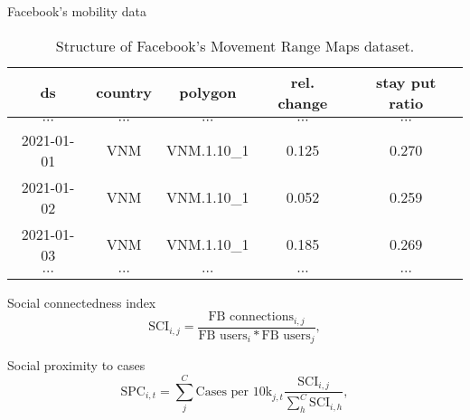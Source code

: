 \begin{frame}[allowframebreaks]{Facebook's mobility data}

    \begin{table}[h]
    \centering
    \begin{tabular}{| c | c | c | c | c |}
        ds & country & polygon & rel. change & stay put ratio \\
        \hline\hline
        $\cdots$ & $\cdots$ & $\cdots$ & $\cdots$ & $\cdots$ \\
        \hline
        2021-01-01 & VNM & VNM.1.10\_1 & 0.125 & 0.270 \\
        \hline
        2021-01-02 & VNM & VNM.1.10\_1 & 0.052 & 0.259 \\
        \hline
        2021-01-03 & VNM & VNM.1.10\_1 & 0.185 & 0.269 \\
        \hline
        $\cdots$ & $\cdots$ & $\cdots$ & $\cdots$ & $\cdots$ \\
    \end{tabular}
    \caption{Structure of Facebook's Movement Range Maps dataset.}
    \label{tab:facebook-movement-range-maps}
    \end{table}

    \framebreak

    \begin{block}{Social connectedness index}
        \begin{equation*}
            \text{SCI}_{i,j} = \frac{\text{FB connections}_{i,j}}{\text{FB users}_i * \text{FB users}_j},
        \end{equation*}
    \end{block}

    \begin{block}{Social proximity to cases \cite{kuchlerGeographicSpreadCOVID192020}}
        \begin{equation*}
            \text{SPC}_{i,t} = \sum_j^C \text{Cases per 10k}_{j,t} \frac{\text{SCI}_{i,j}}{\sum_h^C \text{SCI}_{i,h}},
        \end{equation*}
    \end{block}

\end{frame}

